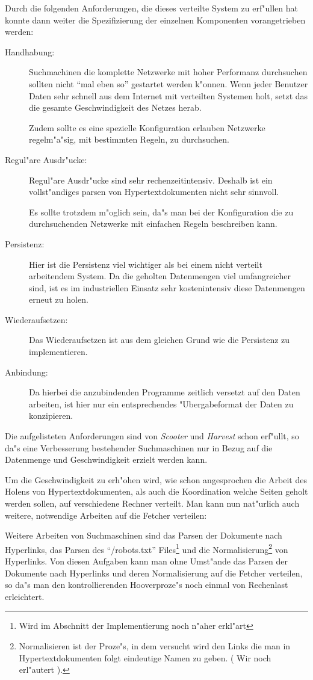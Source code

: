 Durch die folgenden Anforderungen, die dieses verteilte System zu erf"ullen hat konnte dann weiter die Spezifizierung der einzelnen Komponenten vorangetrieben werden:

\begin{description}
	\item[Handhabung:]	Suchmachinen die komplette Netzwerke mit hoher Performanz durchsuchen sollten nicht "`mal eben so"' gestartet werden k"onnen. Wenn jeder Benutzer Daten sehr schnell aus dem Internet mit verteilten Systemen holt, setzt das die gesamte Geschwindigkeit des Netzes herab.
	
	 Zudem sollte es eine spezielle Konfiguration erlauben Netzwerke regelm"a"sig, mit bestimmten Regeln, zu durchsuchen.
	\item[Regul"are Ausdr"ucke:]	Regul"are Ausdr"ucke sind sehr rechenzeitintensiv. Deshalb ist ein vollst"andiges parsen von Hypertextdokumenten nicht sehr sinnvoll.
	
	Es sollte trotzdem m"oglich sein, da"s man bei der Konfiguration die zu durchsuchenden Netzwerke mit einfachen Regeln beschreiben kann.
	\item[Persistenz:]	Hier ist die Persistenz viel wichtiger als bei einem nicht verteilt arbeitendem System. Da die geholten Datenmengen viel umfangreicher sind, ist es im industriellen Einsatz sehr kostenintensiv diese Datenmengen erneut zu holen.
	\item[Wiederaufsetzen:] Das Wiederaufsetzen ist aus dem gleichen Grund wie die Persistenz zu implementieren.
	\item[Anbindung:]	Da hierbei die anzubindenden Programme zeitlich versetzt auf den Daten arbeiten, ist hier nur ein entsprechendes "Ubergabeformat der Daten zu konzipieren.
\end{description}

Die aufgelisteten Anforderungen sind von {\em Scooter} und {\em Harvest} schon erf"ullt, so da"s eine Verbesserung bestehender Suchmaschinen nur in Bezug auf die Datenmenge und Geschwindigkeit erzielt werden kann.

Um die Geschwindigkeit zu erh"ohen wird, wie schon angesprochen die Arbeit des Holens von Hypertextdokumenten, als auch die Koordination welche Seiten geholt werden sollen, auf verschiedene Rechner verteilt. Man kann nun nat"urlich auch weitere, notwendige Arbeiten auf die Fetcher verteilen:

Weitere Arbeiten von Suchmaschinen sind das Parsen der Dokumente nach Hyperlinks, das Parsen des "`/robots.txt"' Files\footnote{Wird im Abschnitt der Implementierung noch n"aher erkl"art} und die Normalisierung\footnote{Normalisieren ist der Proze"s, in dem versucht wird den Links die man in Hypertextdokumenten folgt eindeutige Namen zu geben. ( Wir noch erl"autert ).} von Hyperlinks. Von diesen Aufgaben kann man ohne Umst"ande das Parsen der Dokumente nach Hyperlinks und deren Normalisierung auf die Fetcher verteilen, so da"s man den kontrollierenden Hooverproze"s noch einmal von Rechenlast erleichtert. 

